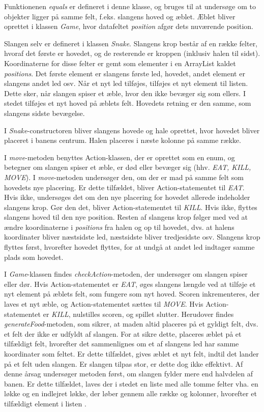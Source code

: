 \documentclass{report}
\begin{document}
Funktionenen \textit{equals} er defineret i denne klasse, og bruges til at undersøge om to objekter ligger på samme felt, f.eks. slangens hoved og æblet. Æblet bliver oprettet i klassen \textit{Game}, hvor datafeltet \textit{position} afgør dets nuværende position.

Slangen selv er defineret i klassen \textit{Snake}. Slangens krop består af en række felter, hvoraf det første er hovedet, og de resterende er kroppen (inklusiv halen til sidst). Koordinaterne for disse felter er gemt som elementer i en ArrayList kaldet \textit{positions}. Det første element er slangens første led, hovedet, andet element er slangens andet led osv. Når et nyt led tilføjes, tilføjes et nyt element til listen. Dette sker, når slangen spiser et æble, hvor den ikke bevæger sig som ellers. I stedet tilføjes et nyt hoved på æblets felt. Hovedets retning er den samme, som slangens sidste bevægelse. 

I \textit{Snake}-constructoren bliver slangens hovede og hale oprettet, hvor hovedet bliver placeret i banens centrum. Halen placeres i næste kolonne på samme række.

I \textit{move}-metoden benyttes Action-klassen, der er oprettet som en enum, og betegner om slangen spiser et æble, er død eller bevæger sig (hhv. \textit{EAT, KILL, MOVE}). I \textit{move}-metoden undersøger den, om der er mad på samme felt som hovedets nye placering. Er dette tilfældet, bliver Action-statementet til \textit{EAT}. Hvis ikke, undersøges det om den nye placering for hovedet allerede indeholder slangens krop. Gør den det, bliver Action-statementet til \textit{KILL}. Hvis ikke, flyttes slangens hoved til den nye position. Resten af slangens krop følger med ved at ændre koordinaterne i \textit{positions} fra halen og op til hovedet, dvs. at halens koordinater bliver næstsidste led, næstsidste bliver tredjesidste osv. Slangens krop flyttes først, hvorefter hovedet flyttes, for at undgå at andet led indtager samme plads som hovedet.

I \textit{Game}-klassen findes \textit{checkAction}-metoden, der undersøger om slangen spiser eller dør. Hvis Action-statementet er \textit{EAT}, øges slangens længde ved at tilføje et nyt element på æblets felt, som fungere som nyt hoved. Scoren inkrementeres, der laves et nyt æble, og Action-statementet sættes til \textit{MOVE}.
Hvis Action-statementet er \textit{KILL}, nulstilles scoren, og spillet slutter.
Herudover findes \textit{generateFood}-metoden, som sikrer, at maden altid placeres på et gyldigt felt, dvs. et felt der ikke er udfyldt af slangen. For at sikre dette, placeres æblet på et tilfældigt felt, hvorefter det sammenlignes om et af slangens led har samme koordinater som feltet. Er dette tilfældet, gives æblet et nyt felt, indtil det lander på et felt uden slangen. Er slangen tilpas stor, er dette dog ikke effektivt. Af denne årsag undersøger metoden først, om slangen fylder mere end halvdelen af banen. Er dette tilfældet, laves der i stedet en liste med alle tomme felter vha. en løkke og en indlejret løkke, der løber gennem alle række og kolonner, hvorefter et tilfældigt element i listen .
\end{document}
